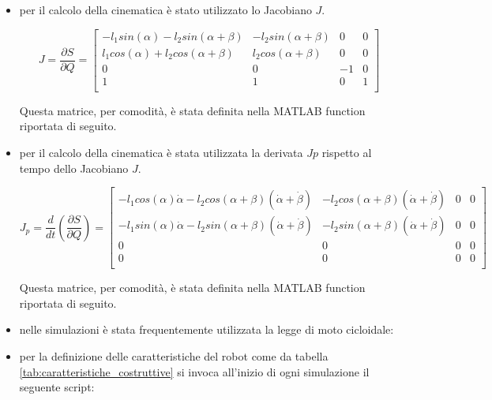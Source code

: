 \begin{itemize}
    \item per il calcolo della cinematica è stato utilizzato lo Jacobiano $J$. 

    \[J = \frac{\partial S}{\partial Q} = \begin{bmatrix}
        -l_1sin(\alpha)-l_2sin(\alpha+\beta) & -l_2sin(\alpha+\beta) & 0 & 0\\
        l_1cos(\alpha)+l_2cos(\alpha+\beta) & l_2cos(\alpha+\beta) & 0 & 0\\
        0 & 0 & -1 & 0\\
        1 & 1 & 0 & 1\\
    \end{bmatrix}\]

    Questa matrice, per comodità, è stata definita nella MATLAB function riportata di seguito.

    

    
    \item per il calcolo della cinematica è stata utilizzata la derivata $Jp$ rispetto al tempo dello Jacobiano $J$. 

    \[J_p = \frac{d}{dt} \left( \frac{\partial S}{\partial Q} \right) = \begin{bmatrix}
       -l_1cos(\alpha)\Dot{\alpha}-l_2cos(\alpha+\beta)(\Dot{\alpha}+\Dot{\beta}) & -l_2cos(\alpha+\beta)(\Dot{\alpha}+\Dot{\beta}) & 0 & 0\\
        -l_1sin(\alpha)\Dot{\alpha}-l_2sin(\alpha+\beta)(\Dot{\alpha}+\Dot{\beta}) & -l_2sin(\alpha+\beta)(\Dot{\alpha}+\Dot{\beta}) & 0 & 0\\
       0 & 0 & 0 & 0\\
       0 & 0 & 0 & 0 \\
    \end{bmatrix} \]

    Questa matrice, per comodità, è stata definita nella MATLAB function riportata di seguito.

    

    \item nelle simulazioni è stata frequentemente utilizzata la legge di moto cicloidale:

    

    \item per la definizione delle caratteristiche del robot come da tabella \ref{tab:caratteristiche_costruttive} si invoca all'inizio di ogni simulazione il seguente script:

    
    
\end{itemize}

